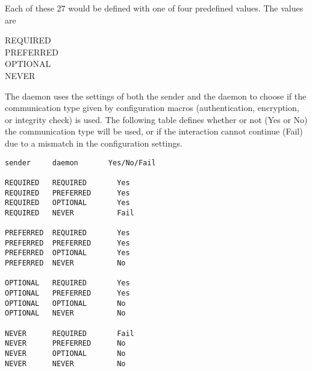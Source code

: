 Each of these 27 would be defined with one of four predefined values.
The values are
\begin{description}
    \item[REQUIRED]
    \item[PREFERRED]
    \item[OPTIONAL]
    \item[NEVER] 
\end{description}

The daemon uses the settings of both the sender and the daemon
to choose if the communication type given by configuration
macros (authentication, encryption, or integrity check) is used.
The following table  defines whether or not (Yes or No) the
communication type will be used, or if the interaction cannot
continue (Fail) due to a mismatch in the configuration settings.

\begin{verbatim}
sender     daemon       Yes/No/Fail

REQUIRED   REQUIRED       Yes
REQUIRED   PREFERRED      Yes
REQUIRED   OPTIONAL       Yes
REQUIRED   NEVER          Fail

PREFERRED  REQUIRED       Yes
PREFERRED  PREFERRED      Yes
PREFERRED  OPTIONAL       Yes
PREFERRED  NEVER          No

OPTIONAL   REQUIRED       Yes
OPTIONAL   PREFERRED      Yes
OPTIONAL   OPTIONAL       No
OPTIONAL   NEVER          No

NEVER      REQUIRED       Fail
NEVER      PREFERRED      No
NEVER      OPTIONAL       No
NEVER      NEVER          No
\end{verbatim}


